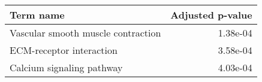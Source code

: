 \begin{tabular}{lr}
\toprule
                         Term name &  Adjusted p-value \\
\midrule
Vascular smooth muscle contraction &          1.38e-04 \\
          ECM-receptor interaction &          3.58e-04 \\
         Calcium signaling pathway &          4.03e-04 \\
\bottomrule
\end{tabular}
